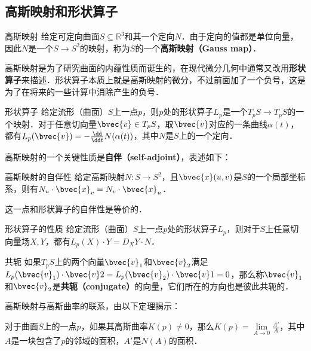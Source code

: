 
\subsection{高斯映射和形状算子}
\begin{definition}{高斯映射}
给定可定向曲面$S\subseteq\mathbb{R}^3$和其一个定向$N$．由于定向的值都是单位向量，因此$N$是一个$S\to S^2$的映射，称为$S$的一个\textbf{高斯映射（Gauss map）}．
\end{definition}

高斯映射是为了研究曲面的内蕴性质而诞生的，在现代微分几何中通常又改用\textbf{形状算子}来描述．形状算子本质上就是高斯映射的微分，不过前面加了一个负号，这是为了在将来的一些计算中消除产生的负号．

\begin{definition}{形状算子}
给定流形（曲面）$S$上一点$p$，则$p$处的形状算子$L_p$是一个$T_pS\to T_pS$的一个映射．对于任意切向量$\bvec{v}\in T_pS$，取$\bvec{v}$对应的一条曲线$\alpha(t)$，都有$L_p(\bvec{v})=-\frac{\dd}{\dd t}N(\alpha(t))$，其中$N$是$S$上的一个定向．
\end{definition}


高斯映射的一个关键性质是\textbf{自伴（self-adjoint）}，表述如下：

\begin{theorem}{高斯映射的自伴性}
给定高斯映射$N:S\to S^2$，且$\bvec{x}(u, v)$是$S$的一个局部坐标系，则有$N_u\cdot \bvec{x}_v=N_v\cdot \bvec{x}_u$．
\end{theorem}

这一点和形状算子的自伴性是等价的．

\begin{theorem}{形状算子的性质}
给定流形（曲面）$S$上一点$p$处的形状算子$L_p$，则对于$S$上任意切向量场$X, Y$，都有$L_p(X)\cdot Y=D_XY\cdot N$．
\end{theorem}


\begin{definition}{共轭}
如果$T_pS$上的两个向量$\bvec{v}_1$和$\bvec{v}_2$满足$L_p(\bvec{v}_1)\cdot \bvec{v}2=L_p(\bvec{v}_2)\cdot \bvec{v}1=0$，那么称$\bvec{v}_1$和$\bvec{v}_2$是\textbf{共轭（conjugate）}的向量，它们所在的方向也是彼此共轭的．
\end{definition}

高斯映射与高斯曲率的联系，由以下定理揭示：

\begin{theorem}{}
对于曲面$S$上的一点$p$，如果其高斯曲率$K(p)\not=0$，那么$K(p)=\lim\limits_{A\to 0}\frac{A'}{A}$，其中$A$是一块包含了$p$的邻域的面积，$A'$是$N(A)$的面积．
\end{theorem}

